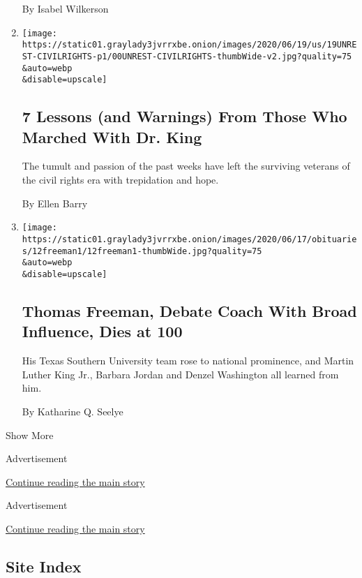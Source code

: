 \begin{enumerate}
  By Isabel Wilkerson
\item
  \href{/2020/06/17/us/george-floyd-protests.html}{}

  \texttt{[image: https://static01.graylady3jvrrxbe.onion/images/2020/06/19/us/19UNREST-CIVILRIGHTS-p1/00UNREST-CIVILRIGHTS-thumbWide-v2.jpg?quality=75\\\&auto=webp\\\&disable=upscale]}

  \hypertarget{7-lessons-and-warnings-from-those-who-marched-with-dr-king}{%
  \subsection{7 Lessons (and Warnings) From Those Who Marched With Dr.
  King}\label{7-lessons-and-warnings-from-those-who-marched-with-dr-king}}

  The tumult and passion of the past weeks have left the surviving
  veterans of the civil rights era with trepidation and hope.

  By Ellen Barry
\item
  \href{/2020/06/16/us/thomas-freeman-debate-coach-with-broad-influence-dies-at-100.html}{}

  \texttt{[image: https://static01.graylady3jvrrxbe.onion/images/2020/06/17/obituaries/12freeman1/12freeman1-thumbWide.jpg?quality=75\\\&auto=webp\\\&disable=upscale]}

  \hypertarget{thomas-freeman-debate-coach-with-broad-influence-dies-at-100}{%
  \subsection{Thomas Freeman, Debate Coach With Broad Influence, Dies at
  100}\label{thomas-freeman-debate-coach-with-broad-influence-dies-at-100}}

  His Texas Southern University team rose to national prominence, and
  Martin Luther King Jr., Barbara Jordan and Denzel Washington all
  learned from him.

  By Katharine Q. Seelye
\end{enumerate}

Show More

Advertisement

\protect\hyperlink{after-mid1}{Continue reading the main story}

Advertisement

\protect\hyperlink{after-mktg}{Continue reading the main story}

\hypertarget{site-index}{%
\subsection{Site Index}\label{site-index}}

